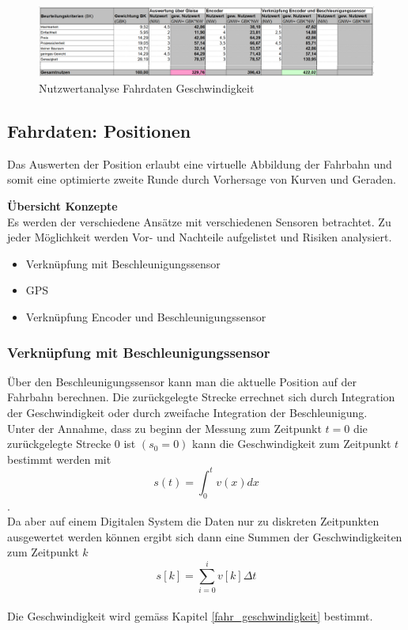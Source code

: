 \documentclass[../../main.tex]{subfiles}
\begin{document}
    \begin{figure}[H]
        \centering
        \includegraphics[width=1.0\textwidth]{Nutzweranalyse_Fahrdaten_Geschwindigkeit.png}
        \caption {Nutzwertanalyse Fahrdaten Geschwindigkeit}
        \label{fig:fahr_nutzwertanalyse_geschwindigkeit}
    \end{figure}

    \subsection{Fahrdaten: Positionen}
    Das Auswerten der Position erlaubt eine virtuelle Abbildung der Fahrbahn und somit eine optimierte zweite Runde durch Vorhersage von Kurven und Geraden.


    \textbf{Übersicht Konzepte}\\
    Es werden der verschiedene Ansätze mit verschiedenen Sensoren betrachtet. Zu jeder Möglichkeit werden Vor- und Nachteile aufgelistet und Risiken analysiert.
    \begin{itemize}
        \item Verknüpfung mit Beschleunigungssensor
        \item GPS
        \item Verknüpfung Encoder und Beschleunigungssensor
    \end{itemize}

    \subsubsection{Verknüpfung mit Beschleunigungssensor}
    Über den Beschleunigungssensor kann man die aktuelle Position auf der Fahrbahn berechnen. Die zurückgelegte Strecke errechnet sich durch Integration der Geschwindigkeit oder durch zweifache Integration der Beschleunigung.\\
    Unter der Annahme, dass zu beginn der Messung zum Zeitpunkt $t = 0$ die zurückgelegte Strecke $0$ ist $(s_0 = 0)$ kann die Geschwindigkeit zum Zeitpunkt $t$ bestimmt werden mit $$s(t) = \int_{0}^{t} v(x) dx$$.\\
    Da aber auf einem Digitalen System die Daten nur zu diskreten Zeitpunkten ausgewertet werden können ergibt sich dann eine Summen der Geschwindigkeiten zum Zeitpunkt $k$ $$s[k] = \sum_{i=0}^{i}v[k] \Delta t$$\\
    Die Geschwindigkeit wird gemäss Kapitel \ref{fahr_geschwindigkeit} bestimmt.
\end{document}
